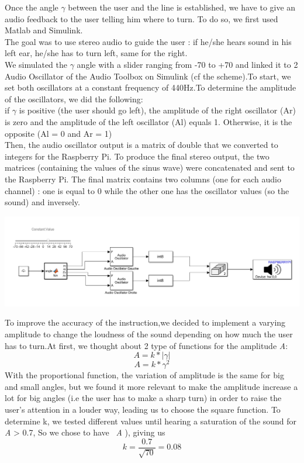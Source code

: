 \documentclass{rapport}
\begin{document}
Once the angle \(\gamma\) between the user and the line is established, we have to give an audio feedback to the user telling him where to turn. To do so, we first used Matlab and Simulink. \\
The goal was to use stereo audio to guide the user : if he/she hears sound in his left ear, he/she has to turn left, same for the right. \\
We simulated the \(\gamma\) angle with a slider ranging from -70 to +70 and linked it to 2 Audio Oscillator of the Audio Toolbox on Simulink (cf the scheme).To start, we set both oscillators at a constant frequency of 440Hz.To determine the amplitude of the oscillators, we did the following:\\ 
if \(\gamma\) is positive (the user should go left), the amplitude of the right oscillator (Ar) is zero and the amplitude of the left oscillator (Al) equals 1. Otherwise, it is the opposite (Al = 0 and Ar = 1) \\
Then, the audio oscillator output is a matrix of double that we converted to integers for the Raspberry Pi.
To produce the final stereo output, the two matrices (containing the values of the sinus wave) were concatenated and sent to the Raspberry Pi.
The final matrix contains two columns (one for each audio channel) : one is equal to 0 while the other one has the oscillator values (so the sound) and inversely.\\
\begin{center}
\includegraphics[width=\linewidth]{sim_audio.png}
\end{center}
To improve the accuracy of the instruction,we decided to implement a varying amplitude to change the loudness of the sound depending on how much the user has to turn.At first, we thought about 2 type of functions for the amplitude \emph{A}:
\[ A = k*|\gamma|\] 
\[ A = k*\gamma^{2} \]
With the proportional function, the variation of amplitude is the same for big and small angles, but we found it more relevant to make the amplitude increase a lot for big angles (i.e the user has to make a sharp turn) in order to raise the user’s attention in a louder way, leading us to choose the square function. To determine k, we tested different values until hearing a saturation of the sound for \emph{A} > 0.7, So we chose to have \ \emph{A} \in [-0.7,0.7])\), giving us \[ k = \frac{0.7}{\sqrt{70}} = 0.08\]
\end{document}
